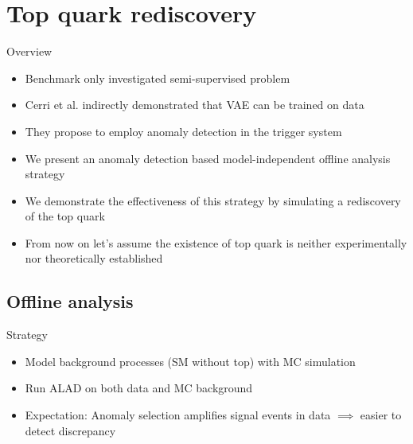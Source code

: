\documentclass{beamer}
\begin{document}
\section{Top quark rediscovery}

\begin{frame}{Overview}
  \begin{itemize}
      \item<1-> Benchmark only investigated semi-supervised problem
      \item<2-> Cerri et al. indirectly demonstrated that VAE can be trained on data
      \item<3-> They propose to employ anomaly detection in the trigger system
      \item<4-> We present an anomaly detection based model-independent offline analysis strategy
      \item<5-> We demonstrate the effectiveness of this strategy by simulating a rediscovery of the top quark
      \item<6-> From now on let's assume the existence of top quark is neither experimentally nor theoretically established
  \end{itemize}
\end{frame}

\subsection{Offline analysis}

\begin{frame}{Strategy}
  \begin{itemize}
      \item<1-> Model background processes (SM without top) with MC simulation
      \item<2-> Run ALAD on both data and MC background
      \item<3-> Expectation: Anomaly selection amplifies signal events in data $\implies$ easier to detect discrepancy
  \end{itemize}
\end{frame}
\end{document}
